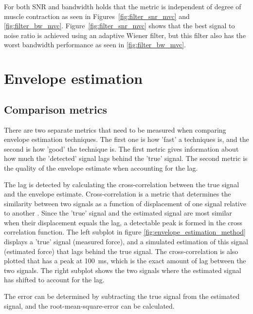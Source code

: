 For both SNR and bandwidth holds that the metric is independent of degree of muscle contraction as seen in Figures~\ref{fig:filter_snr_mvc} and \ref{fig:filter_bw_mvc}.
Figure~\ref{fig:filter_snr_mvc} shows that the best signal to noise ratio is achieved using an adaptive Wiener filter, but this filter also has the worst bandwidth performance as seen in \ref{fig:filter_bw_mvc}. 

\section{Envelope estimation}
\subsection{Comparison metrics}
There are two separate metrics that need to be measured when comparing envelope estimation techniques. The first one is how 'fast' a techniques is, and the second is how 'good' the technique is. The first metric gives information about how much the 'detected' signal lags behind the 'true' signal. The second metric is the quality of the envelope estimate when accounting for the lag.

The lag is detected by calculating the cross-correlation between the true signal and the envelope estimate. Cross-correlation is a metric that determines the similarity between two signals as a function of displacement of one signal relative to another \cite{wiki:cross_correlation}. Since the 'true' signal and the estimated signal are most similar when their displacement equals the lag, a detectable peak is formed in the cross correlation function. The left subplot in figure \ref{fig:envelope_estimation_method} displays a 'true' signal (measured force), and a simulated estimation of this signal (estimated force) that lags behind the true signal. The cross-correlation is also plotted that has a peak at \SI{100}{\milli\second}, which is the exact amount of lag between the two signals. The right subplot shows the two signals where the estimated signal has shifted to account for the lag. 

The error can be determined by subtracting the true signal from the estimated signal, and the root-mean-square-error can be calculated. 

